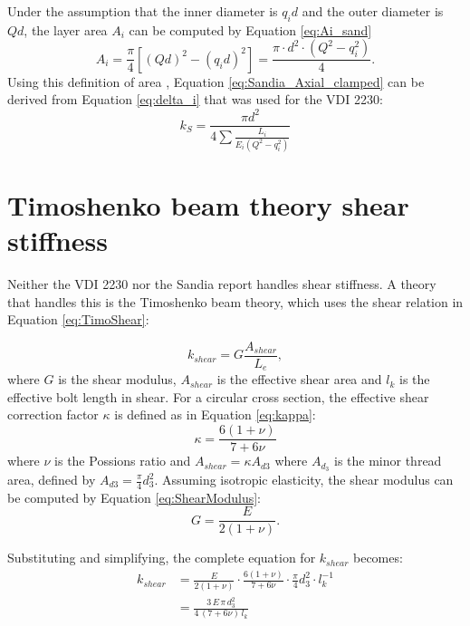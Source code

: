 \documentclass[a4paper,twoside]{bth}
\begin{document}
Under the assumption that the inner diameter is $q_id$ and the outer diameter is $Qd$, the layer area $A_i$ can be computed by Equation \ref{eq:Ai_sand}
\begin{equation}\label{eq:Ai_sand}
    A_i = \frac{\pi}{4}\left[ (Qd)^2 - (q_id)^2 \right] = \frac{\pi \cdot d^2\cdot (Q^2-q_i^2)}{4}.
\end{equation}
Using this definition of area , Equation \ref{eq:Sandia_Axial_clamped} can be derived from Equation \ref{eq:delta_i} that was used for the VDI 2230:
\begin{equation} \label{eq:Sandia_Axial_clamped}
    k_S = \frac{\pi d^2}{4\sum\frac{L_i}{E_i(Q^2-q_i^2)}}
\end{equation}

\section{Timoshenko beam theory shear stiffness} \label{sec:Timoshenko} %
Neither the VDI 2230 nor the Sandia report handles shear stiffness. A theory that handles this is the Timoshenko beam theory, which uses the shear relation in Equation \ref{eq:TimoShear}:

\begin{equation} \label{eq:TimoShear}
    k_{shear} = G\frac{A_{shear}}{L_{e}},
\end{equation}
where $G$ is the shear modulus, $A_{shear}$ is the effective shear area and $l_k$ is the effective bolt length in shear. For a circular cross section, the effective shear correction factor $\kappa$ is defined as in Equation \ref{eq:kappa}:
\begin{equation} \label{eq:kappa}
    \kappa = \frac{6(1+\nu)}{7+6\nu}
\end{equation}
where $\nu$ is the Possions ratio and $A_{shear} = \kappa A_{d3}$ where $A_{d_3}$ is the minor thread area, defined by $A_{d3} = \tfrac{\pi}{4}d_3^2$. Assuming isotropic elasticity, the shear modulus can be computed by Equation \ref{eq:ShearModulus}:
\begin{equation} \label{eq:ShearModulus}
    G = \frac{E}{2(1+\nu)}.
\end{equation}

Substituting and simplifying, the complete equation for $k_{shear}$ becomes:
\begin{equation}
    \begin{aligned}
        k_{shear} &= \frac{E}{2(1+\nu)} \cdot \frac{6(1+\nu)}{7+6\nu} \cdot \frac{\pi}{4}d_3^2\cdot l_k^{-1} \\
                  &= \frac{3\,E\,\pi\,d_3^2}{4\,(7+6\nu)\,l_k}
    \end{aligned}
\end{equation}
\end{document}
